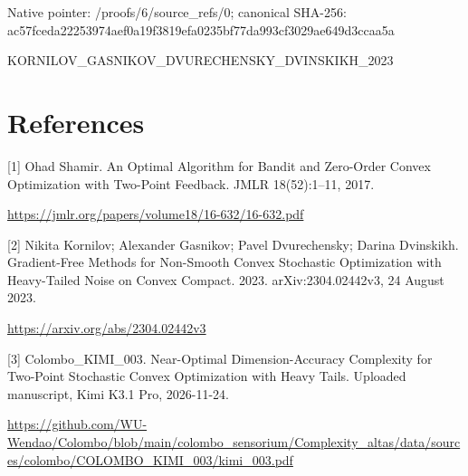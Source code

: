 \documentclass[10pt,a4paper]{article}
\begin{document}
Native pointer: /proofs/6/source\_refs/0; canonical SHA-256: ac57fceda22253974aef0a19\allowbreak{}f3819efa0235bf77da993cf3\allowbreak{}029ae649d3ccaa5a


KORNILOV\_GASNIKOV\_DVUREC\allowbreak{}HENSKY\_DVINSKIKH\_2023


\section{References}


[1] Ohad Shamir. An Optimal Algorithm for Bandit and Zero-Order Convex Optimization with Two-Point Feedback. JMLR 18(52):1--11, 2017.



\url{https://jmlr.org/papers/volume18/16-632/16-632.pdf}



[2] Nikita Kornilov; Alexander Gasnikov; Pavel Dvurechensky; Darina Dvinskikh. Gradient-Free Methods for Non-Smooth Convex Stochastic Optimization with Heavy-Tailed Noise on Convex Compact. 2023. arXiv:2304.02442v3, 24 August 2023.



\url{https://arxiv.org/abs/2304.02442v3}



[3] Colombo\_KIMI\_003. Near-Optimal Dimension-Accuracy Complexity for Two-Point Stochastic Convex Optimization with Heavy Tails. Uploaded manuscript, Kimi K3.1 Pro, 2026-11-24.



\url{https://github.com/WU-Wendao/Colombo/blob/main/colombo_sensorium/Complexity_altas/data/sources/colombo/COLOMBO_KIMI_003/kimi_003.pdf}
\end{document}
